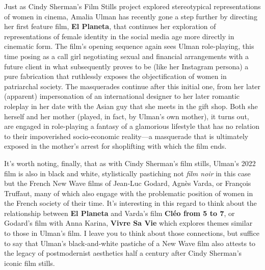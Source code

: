 \documentclass[
  letterpaper,
  DIV=11,
  numbers=noendperiod,
  oneside]{scrartcl}
\begin{document}
Just as Cindy Sherman's Film Stills project explored stereotypical
representations of women in cinema, Amalia Ulman has recently gone a
step further by directing her first feature film, \textbf{El Planeta},
that continues her exploration of representations of female identity in
the social media age more directly in cinematic form. The film's opening
sequence again sees Ulman role-playing, this time posing as a call girl
negotiating sexual and financial arrangements with a future client in
what subsequently proves to be (like her Instagram persona) a pure
fabrication that ruthlessly exposes the objectification of women in
patriarchal society. The masquerades continue after this initial one,
from her later (apparent) impersonation of an international designer to
her later romantic roleplay in her date with the Asian guy that she
meets in the gift shop. Both she herself and her mother (played, in
fact, by Ulman's own mother), it turns out, are engaged in role-playing
a fantasy of a glamorious lifestyle that has no relation to their
impoverished socio-economic reality---a masquerade that is ultimately
exposed in the mother's arrest for shoplifting with which the film ends.

It's worth noting, finally, that as with Cindy Sherman's film stills,
Ulman's 2022 film is also in black and white, stylistically pastiching
not \emph{film noir} in this case but the French New Wave films of
Jean-Luc Godard, Agnès Varda, or François Truffaut, many of which also
engage with the problematic position of women in the French society of
their time. It's interesting in this regard to think about the
relationship between \textbf{El Planeta} and Varda's film \textbf{Cléo
from 5 to 7}, or Godard's film with Anna Karina, \textbf{Vivre Sa Vie}
which explores themes similar to those in Ulman's film. I leave you to
think about those connections, but suffice to say that Ulman's
black-and-white pastiche of a New Wave film also attests to the legacy
of postmodernist aesthetics half a century after Cindy Sherman's iconic
film stills.
\end{document}
